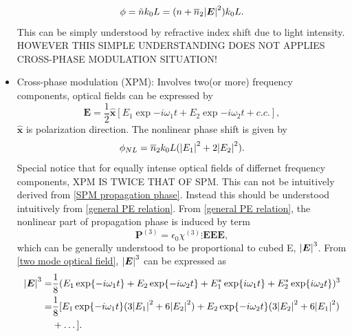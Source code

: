 \documentclass[12pt]{extarticle}
\numberwithin{equation}{section}
\numberwithin{figure}{section}
\numberwithin{table}{section}
\newcommand{\<}{\langle}
\renewcommand{\>}{\rangle}
\theoremstyle{definition}
\begin{document}
\begin{itemize}
                    \begin{equation}
                        \phi = \Tilde{n}k_0 L = (n+\overline{n}_2\abs{\boldsymbol{E}}^2)k_0 L .
                        \label{SPM propagation phase}
                    \end{equation}
                    This can be simply understood by refractive index shift due to light intensity. \MakeUppercase{However this simple understanding does not applies Cross-phase modulation situation!}
                \item Cross-phase modulation (XPM): Involves two(or more) frequency components, optical fields can be expressed by
                    \begin{equation}
                        \boldsymbol{E} = \frac{1}{2} \boldsymbol{\hat{x}}[E_1\exp{-i\omega_1t} + E_2\exp{-i\omega_2 t} + c.c.] ,
                        \label{two mode optical field}
                    \end{equation}
                    $\boldsymbol{\hat{x}}$ is polarization direction. The nonlinear phase shift is given by
                    \begin{equation}
                        \phi_{NL} = \overline{n}_2 k_0 L(\abs{E_1}^2+2\abs{E_2}^2).
                        \label{cross phase modulation NL phase shift}
                    \end{equation}
                Special notice that for equally intense optical fields of differnet frequency components, \MakeUppercase{XPM is twice that of SPM}. This can not be intuitively derived from \autoref{SPM propagation phase}. Instead this should be understood intuitively from \autoref{general PE relation}. From \autoref{general PE relation}, the nonlinear part of propagation phase is induced by term
                \begin{equation}
                    \boldsymbol{P}^{(3)} = \epsilon_0 \chi^{(3)} \vdots \boldsymbol{EEE},
                \end{equation}
                which can be generally understood to be proportional to cubed E, $\abs{\boldsymbol{E}}^3$. From \autoref{two mode optical field}, $\abs{\boldsymbol{E}}^3$ can be expressed as
                \begin{equation}
                    \begin{split}
                        \abs{\boldsymbol{E}}^3 =& \frac{1}{8}(E_1\exp{-i\omega_1 t} + E_2\exp{-i\omega_2 t} + E_1^*\exp{i\omega_1 t} + E_2^*\exp{i\omega_2 t})^3\\
                        =&\frac{1}{8} [E_1\exp{-i\omega_1t}(3\abs{E_1}^2+6\abs{E_2}^2) +E_2\exp{-i\omega_2t}(3\abs{E_2}^2+6\abs{E_1}^2) \\ & +\dots].

\end{split}
\end{equation}
\end{itemize}
\end{document}
